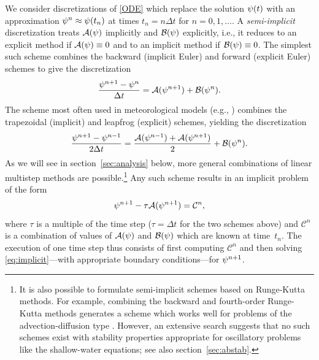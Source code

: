 \documentclass[12pt]{article}
\newcommand{\dt}{\Delta t}
\newcommand{\opA}{\mathcal{A}}
\newcommand{\opB}{\mathcal{B}}
\newcommand{\opC}{\mathcal{C}}
\begin{document}
We consider discretizations of \eqref{ODE} which replace the solution
$\psi(t)$ with an approximation $\psi^n\approx \psi(t_n)$ at times
$t_n=n\dt$ for $n=0,1,\dots$.  A \emph{semi-implicit} discretization treats
$\opA(\solvec)$ implicitly and $\opB(\solvec)$ explicitly, i.e., it reduces to
an explicit method if $\opA(\solvec)\equiv0$ and to an implicit method if
$\opB(\solvec)\equiv0$.  The simplest such scheme combines the backward
(implicit Euler) and forward (explicit Euler) schemes to give the
discretization
\begin{equation}
  \frac{\solvec^{n+1}-\solvec^{n}}{\dt} = \opA(\solvec^{n+1}) + \opB(\solvec^{n}) .
\label{BACK-FOR}
\end{equation}
The scheme most often used in meteorological models (e.g., 
\cite{Kwizak_Robert71, Cote_Beland_Staniforth83, Simmons_Hoskins_Burridge78,
Staniforth_Daley79})
combines the trapezoidal (implicit) and leapfrog (explicit) schemes, yielding
the discretization 
\begin{equation}
  \frac{\solvec^{n+1}-\solvec^{n-1}}{2\dt} =
\frac{\opA(\solvec^{n-1})+\opA(\solvec^{n+1})}{2} 
    + \opB(\solvec^{n}) .
\label{TRAP-LFG}
\end{equation}
As we will see in section~\ref{sec:analysis} below, more general
combinations of linear multistep methods are possible.\footnote{It is also
possible to formulate semi-implicit schemes based on Runge-Kutta methods.
For example, combining the backward and fourth-order Runge-Kutta methods
generates a scheme which works well for problems of the advection-diffusion
type \cite{Fulton93}.  However, an extensive search \cite{Kang94} suggests
that no such schemes exist with stability properties appropriate for
oscillatory problems like the shallow-water equations; see also
section~\ref{sec:abstab}.} Any such scheme results in an implicit problem of
the form
\begin{equation}
  \solvec^{n+1}-\tau\opA(\solvec^{n+1}) = \opC^{n},
\label{eq:implicit}
\end{equation}
where $\tau$ is a multiple of the time step ($\tau=\dt$ for the two schemes
above) and $\opC^{n}$ is a combination of values of $\opA(\solvec)$ and
$\opB(\solvec)$ which are known at time~$t_n$.  The execution of one time step
thus consists of first computing $\opC^{n}$ and then solving
\eqref{eq:implicit}---with appropriate boundary conditions---for
$\psi^{n+1}$.
\end{document}
